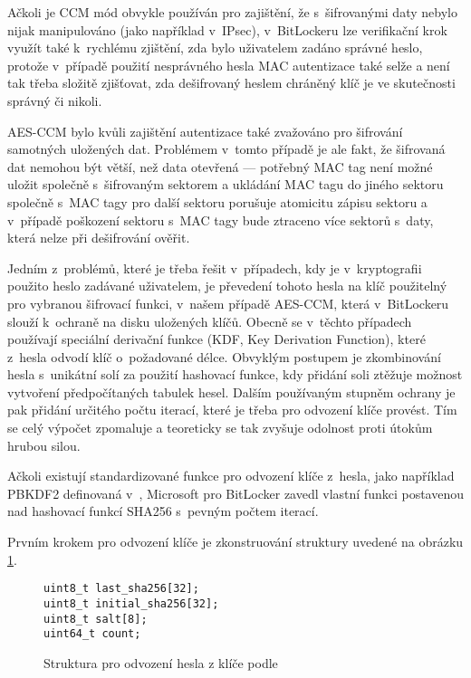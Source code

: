 Ačkoli je CCM mód obvykle používán pro zajištění, že s~šifrovanými daty nebylo nijak manipulováno (jako například v~IPsec\cite{Housley2005}), v~BitLockeru lze verifikační krok využít také k~rychlému zjištění, zda bylo uživatelem zadáno správné heslo, protože v~případě použití nesprávného hesla MAC autentizace také selže a není tak třeba složitě zjišťovat, zda dešifrovaný heslem chráněný klíč je ve skutečnosti správný či nikoli.

AES-CCM bylo kvůli zajištění autentizace také zvažováno pro šifrování samotných uložených dat. Problémem v~tomto případě je ale fakt, že šifrovaná dat nemohou být větší, než data otevřená --- potřebný MAC tag není možné uložit společně s~šifrovaným sektorem a ukládání MAC tagu do jiného sektoru společně s~MAC tagy pro další sektoru porušuje atomicitu zápisu sektoru a v~případě poškození sektoru s~MAC tagy bude ztraceno více sektorů s~daty, která nelze při dešifrování ověřit.\cite{Ferguson2006}

\label{sec:kdf}

Jedním z~problémů, které je třeba řešit v~případech, kdy je v~kryptografii použito heslo zadávané uživatelem, je převedení tohoto hesla na klíč použitelný pro vybranou šifrovací funkci, v~našem případě AES-CCM, která v~BitLockeru slouží k~ochraně na disku uložených klíčů. Obecně se v~těchto případech používají speciální derivační funkce (KDF, Key Derivation Function), které z~hesla odvodí klíč o~požadované délce. Obvyklým postupem je zkombinování hesla s~unikátní solí za použití hashovací funkce, kdy přidání soli ztěžuje možnost vytvoření předpočítaných tabulek hesel. Dalším používaným stupněm ochrany je pak přidání určitého počtu iterací, které je třeba pro odvození klíče provést. Tím se celý výpočet zpomaluje a teoreticky se tak zvyšuje odolnost proti útokům hrubou silou.\cite{Kaliski2000}

Ačkoli existují standardizované funkce pro odvození klíče z~hesla, jako například PBKDF2 definovaná v~\cite{Kaliski2000}, Microsoft pro BitLocker zavedl vlastní funkci postavenou nad hashovací funkcí SHA256 s~pevným počtem iterací.

Prvním krokem pro odvození klíče je zkonstruování struktury uvedené na obrázku \ref{fig:bitlocker-kdf}.

\begin{figure}[h]
		\centering
		\captionsetup{width=0.65\linewidth}
\begin{lstlisting}[frame=none, escapechar=$, basicstyle=\ttfamily\small, columns=fullflexible, keepspaces=true, xleftmargin=.35\textwidth, xrightmargin=.35\textwidth]
uint8_t last_sha256[32];
uint8_t initial_sha256[32];
uint8_t salt[8];
uint64_t count;
\end{lstlisting}
		\caption{Struktura pro odvození hesla z klíče podle \cite{Metz2011}}
		\label{fig:bitlocker-kdf}
\end{figure}

